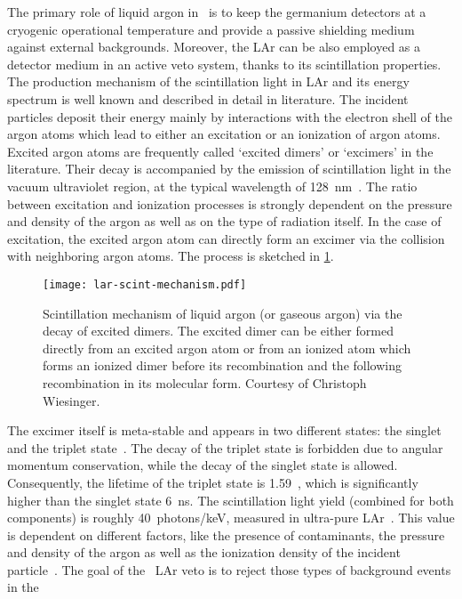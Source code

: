 The primary role of liquid argon in \gerda\ is to keep the germanium detectors at a
cryogenic operational temperature and provide a passive shielding medium against external
backgrounds. Moreover, the LAr can be also employed as a detector medium in an active veto
system, thanks to its scintillation properties. The production mechanism of the
scintillation light in LAr and its energy spectrum is well known and described in detail
in literature. The incident particles deposit their energy mainly by interactions with the
electron shell of the argon atoms which lead to either an excitation or an ionization of
argon atoms. Excited argon atoms are frequently called `excited dimers' or `excimers' in
the literature. Their decay is accompanied by the emission of scintillation light in the
vacuum ultraviolet region, at the typical wavelength of 128~nm~\cite{Heindl2010}. The
ratio between excitation and ionization processes is strongly dependent on the pressure
and density of the argon as well as on the type of radiation itself. In the case of
excitation, the excited argon atom can directly form an excimer via the collision with
neighboring argon atoms. The process is sketched in \cref{fig:setup:lar-scint}.
\begin{figure}
  \centering
  \texttt{[image: lar-scint-mechanism.pdf]}
  \caption{%
    Scintillation mechanism of liquid argon (or gaseous argon) via the decay of excited
    dimers. The excited dimer can be either formed directly from an excited argon atom or
    from an ionized atom which forms an ionized dimer before its recombination and the
    following recombination in its molecular form. Courtesy of Christoph Wiesinger.
  }\label{fig:setup:lar-scint}
\end{figure}
The excimer itself is meta-stable and appears in two different states: the singlet and the
triplet state~\cite{Jortner1965, McCusker1984}.  The decay of the triplet state is
forbidden due to angular momentum conservation, while the decay of the singlet state is
allowed. Consequently, the lifetime of the triplet state is 1.59~\mus, which is
significantly higher than the singlet state 6~ns. The scintillation light yield
(combined for both components) is roughly 40~photons/keV, measured in ultra-pure
LAr~\cite{Doke1988}. This value is dependent on different factors, like the presence of
contaminants, the pressure and density of the argon as well as the ionization density of
the incident particle~\cite{Doke1988}.
\newpar
The goal of the \gerda\ LAr veto is to reject those types of background events in the
